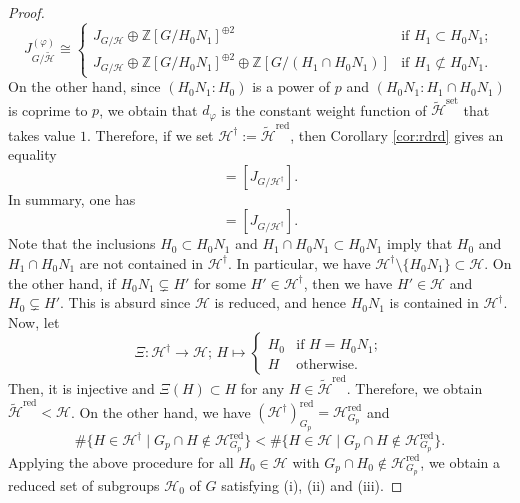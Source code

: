 \documentclass[12pt]{amsart}
\theoremstyle{plain}
\theoremstyle{definition}
\numberwithin{thm}{section}
\numberwithin{equation}{section}
\newcommand{\Z}{\mathbb{Z}}
\newcommand{\cH}{\mathcal{H}}
\DeclareMathOperator{\red}{red}
\DeclareMathOperator{\set}{set}
\begin{document}
\begin{proof}
\begin{equation*}
J_{G/\widetilde{\cH}}^{(\varphi)} \cong 
\begin{cases}
J_{G/\cH}\oplus \Z[G/H_{0}N_{1}]^{\oplus 2}&\text{if }H_{1}\subset H_{0}N_{1};\\
J_{G/\cH}\oplus \Z[G/H_{0}N_{1}]^{\oplus 2}\oplus \Z[G/(H_{1}\cap H_{0}N_{1})]&\text{if }H_{1}\not\subset H_{0}N_{1}. 
\end{cases}
\end{equation*}
On the other hand, since $(H_{0}N_{1}:H_{0})$ is a power of $p$ and $(H_{0}N_{1}:H_{1}\cap H_{0}N_{1})$ is coprime to $p$, we obtain that $d_{\varphi}$ is the constant weight function of $\widetilde{\cH}^{\set}$ that takes value $1$. Therefore, if we set $\cH^{\dagger}:=\widetilde{\cH}^{\red}$, then Corollary \ref{cor:rdrd} gives an equality
\begin{equation*}
[J_{G/\widetilde{\cH}}^{(\varphi)}]=[J_{G/{\cH}^{\dagger}}]. 
\end{equation*}
In summary, one has
\begin{equation*}
[J_{G/\cH}]=[J_{G/\cH^{\dagger}}]. 
\end{equation*}
Note that the inclusions $H_{0} \subset H_{0}N_{1}$ and $H_{1}\cap H_{0}N_{1}\subset H_{0}N_{1}$ imply that $H_{0}$ and $H_{1}\cap H_{0}N_{1}$ are not contained in ${\cH}^{\dagger}$. In particular, we have ${\cH}^{\dagger}\setminus \{H_{0}N_{1}\}\subset \cH$. On the other hand, if $H_{0}N_{1}\subsetneq H'$ for some $H'\in \cH^{\dagger}$, then we have $H'\in \cH$ and $H_{0}\subsetneq H'$. This is absurd since $\cH$ is reduced, and hence $H_{0}N_{1}$ is contained in ${\cH}^{\dagger}$. Now, let
\begin{equation*}
\Xi \colon {\cH}^{\dagger}\rightarrow \cH;\,H\mapsto 
\begin{cases}
    H_{0}&\text{if }H=H_{0}N_{1}; \\
    H&\text{otherwise. }
\end{cases}
\end{equation*}
Then, it is injective and $\Xi(H)\subset H$ for any $H\in \widetilde{\cH}^{\red}$. Therefore, we obtain $\widetilde{\cH}^{\red}<\cH$. On the other hand, we have $({\cH}^{\dagger})_{G_{p}}^{\red}=\cH_{G_{p}}^{\red}$ and
\begin{equation*}
\#\{H\in \cH^{\dagger} \mid G_{p}\cap H\notin \cH_{G_{p}}^{\red}\}<
\#\{H\in \cH \mid G_{p}\cap H\notin \cH_{G_{p}}^{\red}\}.
\end{equation*}
Applying the above procedure for all $H_{0}\in \cH$ with $G_{p}\cap H_{0}\notin \cH_{G_{p}}^{\red}$, we obtain a reduced set of subgroups $\cH_{0}$ of $G$ satisfying (i), (ii) and (iii). 
\end{proof}
\end{document}
